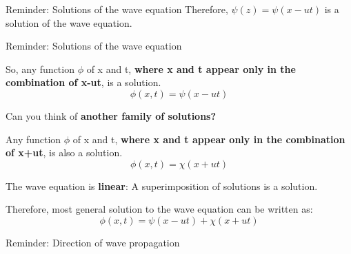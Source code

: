 {\begin{frame}{Reminder: Solutions of the wave equation}
Therefore,  $\psi(z) =  \psi(x-ut)$ is a solution of the wave equation.

\end{frame}


%
%
%
%

\begin{frame}{Reminder: Solutions of the wave equation}

So, any function $\phi$ of x and t,
{\bf where x and t appear only in the combination of x-ut},
is a solution.
\begin{equation*}
  \phi(x,t) = \psi(x-ut)
\end{equation*}

\vspace{0.1cm}

Can you think of {\bf another family of solutions?}\\

\vspace{0.1cm}

Any function $\phi$ of x and t,
{\bf where x and t appear only in the combination of x+ut},
is also a solution.
\begin{equation*}
  \phi(x,t) = \chi(x+ut)
\end{equation*}

\vspace{0.1cm}

The wave equation is {\bf linear}: A superimposition of solutions is a solution.\\

\vspace{0.1cm}

Therefore, most general solution to the wave equation can be written as:\\

\begin{equation*}
  \phi(x,t) = \psi(x-ut) + \chi(x+ut)
\end{equation*}

\end{frame}

%
%
%
%

\begin{frame}{Reminder: Direction of wave propagation}



\end{frame}}
